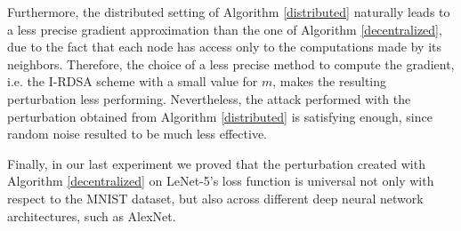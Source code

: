 Furthermore, the
distributed setting of Algorithm \ref{distributed} naturally leads to a less precise gradient approximation than the one of Algorithm \ref{decentralized}, due to the
fact that each node has access only to the computations made by its neighbors. Therefore, the choice of a less precise
method to compute the gradient, i.e. the I-RDSA scheme with a small value for $m$, makes the resulting perturbation
less performing. Nevertheless, the attack performed with the perturbation obtained from Algorithm \ref{distributed} is satisfying enough, since random noise resulted to be much less effective.

Finally, in our last experiment we proved that the perturbation created with Algorithm \ref{decentralized} on LeNet-5's loss function is universal
not only with respect to the MNIST dataset, but also across different deep neural network architectures, such as AlexNet.

